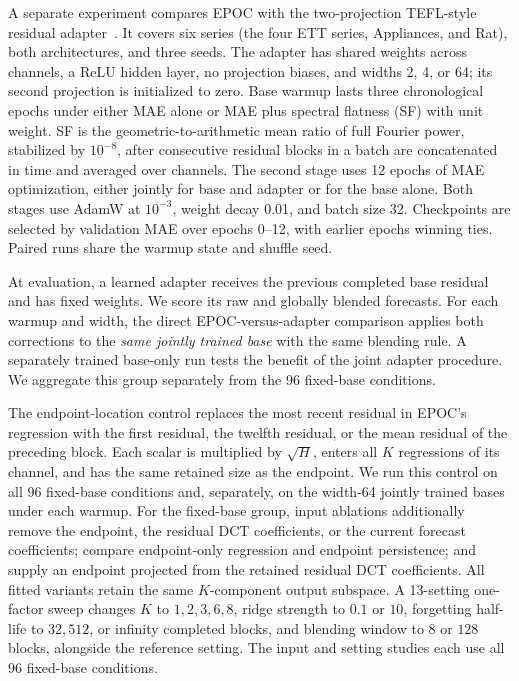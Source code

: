 A separate experiment compares EPOC with the two-projection TEFL-style residual adapter~\cite{tefl2026}. It covers six series (the four ETT series, Appliances, and Rat), both architectures, and three seeds. The adapter has shared weights across channels, a ReLU hidden layer, no projection biases, and widths 2, 4, or 64; its second projection is initialized to zero. Base warmup lasts three chronological epochs under either MAE alone or MAE plus spectral flatness (SF) with unit weight. SF is the geometric-to-arithmetic mean ratio of full Fourier power, stabilized by $10^{-8}$, after consecutive residual blocks in a batch are concatenated in time and averaged over channels. The second stage uses 12 epochs of MAE optimization, either jointly for base and adapter or for the base alone. Both stages use AdamW at $10^{-3}$, weight decay 0.01, and batch size 32. Checkpoints are selected by validation MAE over epochs 0--12, with earlier epochs winning ties. Paired runs share the warmup state and shuffle seed.

At evaluation, a learned adapter receives the previous completed base residual and has fixed weights. We score its raw and globally blended forecasts. For each warmup and width, the direct EPOC-versus-adapter comparison applies both corrections to the \emph{same jointly trained base} with the same blending rule. A separately trained base-only run tests the benefit of the joint adapter procedure. We aggregate this group separately from the 96 fixed-base conditions.

The endpoint-location control replaces the most recent residual in EPOC's regression with the first residual, the twelfth residual, or the mean residual of the preceding block. Each scalar is multiplied by $\sqrt H$, enters all $K$ regressions of its channel, and has the same retained size as the endpoint. We run this control on all 96 fixed-base conditions and, separately, on the width-64 jointly trained bases under each warmup. For the fixed-base group, input ablations additionally remove the endpoint, the residual DCT coefficients, or the current forecast coefficients; compare endpoint-only regression and endpoint persistence; and supply an endpoint projected from the retained residual DCT coefficients. All fitted variants retain the same $K$-component output subspace. A 13-setting one-factor sweep changes $K$ to $1,2,3,6,8$, ridge strength to $0.1$ or $10$, forgetting half-life to $32,512$, or infinity completed blocks, and blending window to $8$ or $128$ blocks, alongside the reference setting. The input and setting studies each use all 96 fixed-base conditions.

